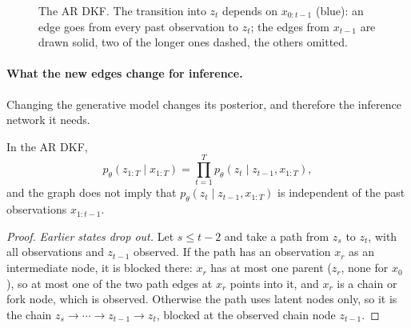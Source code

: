 \begin{notechapter}
\begin{figure}[ht]
\centering
{}
\caption{The AR DKF. The transition into $z_t$ depends on $x_{0:t-1}$ (blue): an edge goes from every past
observation to $z_t$; the edges from $x_{t-1}$ are drawn solid, two of the longer ones dashed, the others
omitted.}
\label{dkf:fig:ar}
\end{figure}

\paragraph{What the new edges change for inference.} Changing the generative model changes
its posterior, and therefore the inference network it needs.

\begin{proposition}\label{dkf:prop:ar-posterior}
In the AR DKF,
\[
  p_\theta(z_{1:T}\mid x_{1:T}) = \prod_{t=1}^Tp_\theta(z_t\mid z_{t-1}, x_{1:T}),
\]
and the graph does not imply that $p_\theta(z_t\mid z_{t-1}, x_{1:T})$ is independent of the past observations $x_{1:t-1}$.
\end{proposition}

\begin{proof}
\emph{Earlier states drop out.} Let $s\leq t-2$ and take a path from $z_s$ to $z_t$, with all observations and
$z_{t-1}$ observed. If the path has an observation $x_r$ as an intermediate node, it is blocked there: $x_r$ has at
most one parent ($z_r$, none for $x_0$), so at most one of the two path edges at $x_r$ points into it, and $x_r$ is a chain or
fork node, which is observed. Otherwise the path uses latent nodes only, so it is the chain
$z_s\to\cdots\to z_{t-1}\to z_t$, blocked at the observed chain node $z_{t-1}$.


\end{proof}
\end{notechapter}
